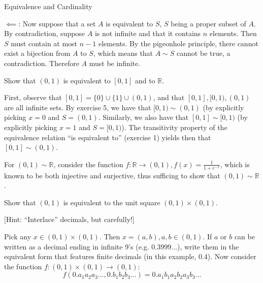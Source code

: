 \begin{section}{Equivalence and Cardinality}
\begin{solution}
    $\impliedby$: Now suppose that a set $A$ is equivalent to $S$, $S$ being a proper subset of $A$. 
    By contradiction, suppose $A$ is not infinite and that it contains $n$ elements.
    Then $S$ must contain at most $n - 1$ elements.
    By the pigeonhole principle, there cannot exist a bijection from $A$ to $S$, which means that $A \sim S$ cannot be true, a contradiction.
    Therefore $A$ must be infinite.
\end{solution}


\begin{exercise}{8}
    Show that $(0, 1)$ is equivalent to $[0, 1]$ and to $\mathbb{R}$.
\end{exercise}

\begin{solution}

    First, observe that $[0, 1] = \{0\} \cup \{1\} \cup (0, 1)$, and that $[0, 1], [0, 1), (0, 1)$ are all infinite sets.
    By exercise 5, we have that $[0, 1) \sim (0, 1)$ (by explicitly picking $x = 0$ and $S = (0, 1)$.
    Similarly, we also have that $[0, 1] \sim [0, 1)$ (by explicitly picking $x = 1$ and $S = [0, 1)$).
    The transitivity property of the equivalence relation ``is equivalent to'' (exercise 1) yields then that $[0, 1] \sim (0, 1)$.

    For $(0, 1) \sim \mathbb{R}$, consider the function $f: \mathbb{R} \rightarrow (0, 1), f(x) = \frac{1}{1 + e^{-x}}$, which is known to be both injective and surjective, thus sufficing to show that $(0, 1) \sim \mathbb{R}$.
\end{solution}

\begin{exercise}{9}
    Show that $(0, 1)$ is equivalent to the unit square $(0, 1) \times (0, 1)$.

    [Hint: ``Interlace'' decimals, but carefully!]
\end{exercise}

\begin{solution}

    Pick any $x \in (0, 1) \times (0, 1)$. 
    Then $x = (a, b), a, b \in (0, 1)$. 
    If $a$ or $b$ can be written as a decimal ending in infinite 9's (e.g. $0.3999\ldots$), write them in the equivalent form that features finite decimals (in this example, 0.4).
    Now consider the function $f: (0, 1) \times (0, 1) \rightarrow (0, 1)$:
    $$f(0.a_1a_2a_3\ldots, 0.b_1b_2b_3\ldots) = 0.a_1b_1a_2b_2a_3b_3\ldots$$
     

\end{solution}
\end{section}
